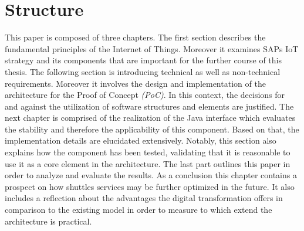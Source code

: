 \section{Structure}
This paper is composed of three chapters. The first section describes
the fundamental principles of the Internet of Things. Moreover it examines SAPs
IoT strategy and its components that are important for the further course of
this thesis. \newline The following section is introducing technical as well as
non-technical requirements. Moreover it involves the design and implementation
of the architecture for the Proof of Concept \emph{(PoC)}. In this context, the
decisions for and against the utilization of software structures and elements
are justified.
\newline The next chapter is comprised of the realization of the Java interface
which evaluates the stability and therefore the applicability of this component.
Based on that, the implementation details are elucidated extensively. Notably,
this section also explains how the component has been tested, validating that it
is reasonable to use it as a core element in the architecture.
\newline The last part outlines this paper in order to analyze and evaluate the
results. As a conclusion this chapter contains a prospect on how shuttles
services may be further optimized in the future. It also includes a reflection
about the advantages the digital transformation offers in comparison to the
existing model in order to measure to which extend the architecture is
practical.
